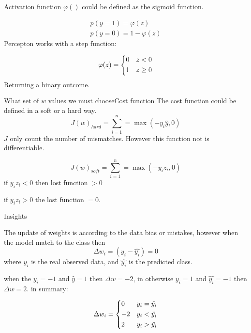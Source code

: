 \documentclass{beamer}
\begin{document}
\begin{frame}[fragile]{Activation function}
$\varphi()$ could be defined as the sigmoid function.

\begin{equation}
\begin{align*}
p(y=1) = \varphi(z) \\
p(y=0) = 1 -\varphi(z)
\end{align*}
\end{equation}
Percepton works with a step function:

\begin{equation*}
\varphi(z) = 
    \begin{dcases}
        0 &  z < 0 \\
        1 &  z \geq 0
    \end{dcases}
\end{equation*}    
Returning  a binary outcome.
\end{frame}


\begin{frame}{What set of $w$ values we must choose}{Cost function}
The cost function could be defined in a soft or a hard way.
\begin{equation}
J(w)_{hard} = \sum_{i=1}^{n} = \max(-y_{i}\hat{y},0)
\end{equation}
$J$ only count the number of mismatches.
However this function not is differentiable.

\begin{equation}
J(w)_{soft} = \sum_{i=1}^{n} = \max(-y_{i} z_{i},0)
\end{equation}
if $y_{i}z_{i} < 0 $  then lost function $>0$

if $y_{i}z_{i}>0 $  the lost function $=0$.

\end{frame}




\begin{frame}[fragile]{Insights}

The update of weights is according to the data bias or mistakes, however when the model match to the class then
\begin{equation}
\Delta w_{i} = (y_{i} -\hat{y_{i}}) = 0
\end{equation}
where $y_{i}$ is the real observed data, and $\hat{y_{i}}$ is the predicted class.

when the $y_{i} = -1$ and $\hat{y} = 1$ then $\Delta w = -2$, in otherwise $y_{i}=1$ and $\hat{y_{i}}=-1$ then $\Delta w = 2$.
in summary:

\begin{equation*}
\Delta w_{i} = 
    \begin{dcases}
        0 &  y_{i} = \hat{y_{i}} \\
       -2 &  y_{i}<\hat{y_{i}}  \\
         2 &  y_{i}>\hat{y_{i}}
    \end{dcases}
\end{equation*}    
\end{frame}
\end{document}
